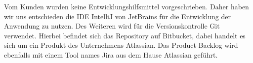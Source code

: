 Vom Kunden wurden keine Entwicklungshilfsmittel vorgeschrieben.
Daher haben wir uns entschieden die IDE IntelliJ von JetBrains für die Entwicklung der Anwendung zu nutzen.
Des Weiteren wird für die Versionskontrolle Git verwendet.
Hierbei befindet sich das Repository auf Bitbucket, dabei handelt es sich um ein Produkt des Unternehmens Atlassian.
Das Product-Backlog wird ebenfalls mit einem Tool names Jira aus dem Hause Atlassian geführt.